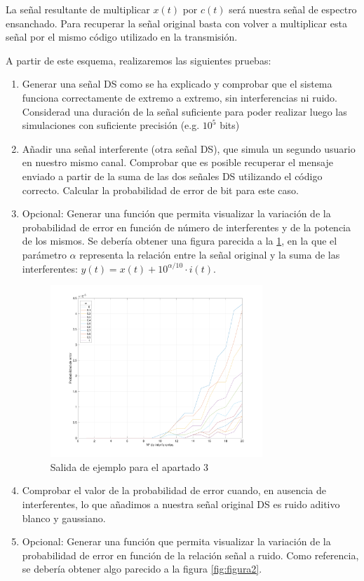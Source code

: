 \documentclass[es,practica]{uah}
\begin{document}
La señal resultante de multiplicar $x(t)$ por $c(t)$ será nuestra señal de espectro ensanchado. Para recuperar la señal original basta con volver a multiplicar esta señal por el mismo código utilizado en la transmisión. 

A partir de este esquema, realizaremos las siguientes pruebas:

\begin{enumerate}
	\item Generar una señal DS como se ha explicado y comprobar que el sistema funciona correctamente de extremo a extremo, sin interferencias ni ruido. Considerad una duración de la señal suficiente para poder realizar luego las simulaciones con suficiente precisión (e.g. $10^5$ bits)
	\item Añadir una señal interferente (otra señal DS), que simula un segundo usuario en nuestro mismo canal. Comprobar que es posible recuperar el mensaje enviado a partir de la suma de las dos señales DS utilizando el código correcto. Calcular la probabilidad de error de bit para este caso. 
	\item Opcional: Generar una función que permita visualizar la variación de la probabilidad de error en función de número de interferentes y de la potencia de los mismos. Se debería obtener una figura parecida a la \ref{fig:figura1}, en la que el parámetro $\alpha$ representa la relación entre la señal original y la suma de las interferentes: $y(t) = x(t) + 10^{\alpha/10}\cdot i(t)$.
	

	\begin{figure}[h!]
		\centering\includegraphics[width=8cm]{../Apuntes/Figuras/Figura1}
		\caption{Salida de ejemplo para el apartado 3}
		\label{fig:figura1}
	\end{figure}


	\item Comprobar el valor de la probabilidad de error cuando, en ausencia de interferentes, lo que añadimos a nuestra señal original DS es ruido aditivo blanco y gaussiano.
	\item Opcional: Generar una función que permita visualizar la variación de la probabilidad de error en función de la relación señal a ruido. Como referencia, se debería obtener algo parecido a la figura \ref{fig:figura2}.
	

\end{enumerate}
\end{document}

